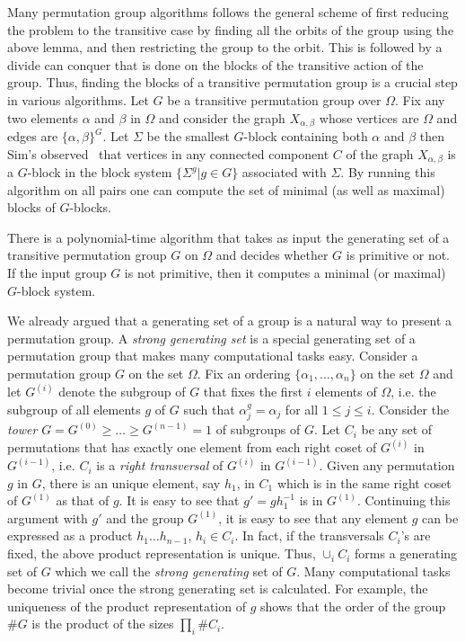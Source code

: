 \documentclass{article}
\begin{document}
Many permutation group algorithms follows the general scheme of first
reducing the problem to the transitive case by finding all the orbits
of the group using the above lemma, and then restricting the group to
the orbit. This is followed by a divide can conquer that is done on
the blocks of the transitive action of the group. Thus, finding the
blocks of a transitive permutation group is a crucial step in various
algorithms. Let $G$ be a transitive permutation group over
$\Omega$. Fix any two elements $\alpha$ and $\beta$ in $\Omega$ and
consider the graph $X_{\alpha,\beta}$ whose vertices are $\Omega$ and
edges are $\{\alpha,\beta\}^G$. Let $\Sigma$ be the smallest $G$-block
containing both $\alpha$ and $\beta$ then Sim's observed~\cite{sims67}
that vertices in any connected component $C$ of the graph
$X_{\alpha,\beta}$ is a $G$-block in the block system $\{ \Sigma^g | g
\in G\}$ associated with $\Sigma$. By running this algorithm on all
pairs one can compute the set of minimal (as well as maximal) blocks
of $G$-blocks.

\begin{lemma}
  \label{lem:block_cal}
  There is a polynomial-time algorithm that takes as input the
  generating set of a transitive permutation group $G$ on $\Omega$ and
  decides whether $G$ is primitive or not. If the input group $G$ is
  not primitive, then it computes a minimal (or maximal) $G$-block
  system.
\end{lemma}

We already argued that a generating set of a group is a natural way to
present a permutation group. A \emph{strong generating set} is a
special generating set of a permutation group that makes many
computational tasks easy. Consider a permutation group $G$ on the set
$\Omega$. Fix an ordering $\{ \alpha_1,\ldots,\alpha_n\}$ on the set
$\Omega$ and let $G^{(i)}$ denote the subgroup of $G$ that fixes the
first $i$ elements of $\Omega$, i.e. the subgroup of all elements $g$
of $G$ such that $\alpha_j^g = \alpha_j$ for all $1 \leq j \leq
i$. Consider the \emph{tower} $G = G^{(0)} \geqslant \ldots \geqslant
G^{(n-1)} = 1$ of subgroups of $G$. Let $C_i$ be any set of
permutations that has exactly one element from each right coset of
$G^{(i)}$ in $G^{(i-1)}$, i.e. $C_i$ is a \emph{right transversal} of
$G^{(i)}$ in $G^{(i-1)}$. Given any permutation $g$ in $G$, there is
an unique element, say $h_1$, in $C_1$ which is in the same right
coset of $G^{(1)}$ as that of $g$. It is easy to see that $g' =
gh_1^{-1}$ is in $G^{(1)}$. Continuing this argument with $g'$ and the
group $G^{(1)}$, it is easy to see that any element $g$ can be
expressed as a product $h_1\ldots h_{n-1}$, $h_i\in C_i$. In fact, if
the transversals $C_i$'s are fixed, the above product representation
is unique. Thus, $\cup_i C_i$ forms a generating set of $G$ which we
call the \emph{strong generating} set of $G$.  Many computational
tasks become trivial once the strong generating set is calculated. For
example, the uniqueness of the product representation of $g$ shows
that the order of the group $\#G$ is the product of the sizes $\prod_i
\# C_i$.
\end{document}
